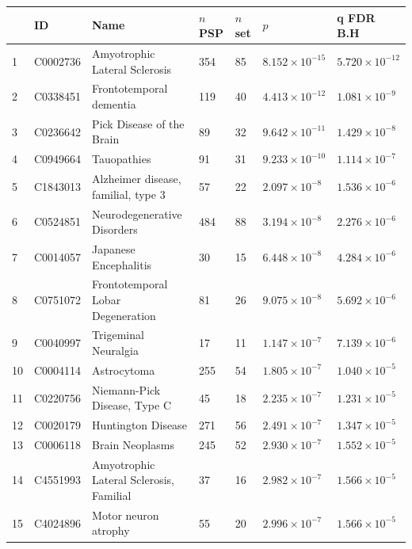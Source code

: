 \begin{table}[ht]
\centering

\setlength{\extrarowheight}{2pt}
\begin{adjustbox}{width=\textwidth}

\begin{tabular}{lllllll}
  \toprule
 & ID & Name & $n$ PSP & $n$ set & $p$ & q FDR B.H \\ 
  \midrule
1 & C0002736 & Amyotrophic Lateral Sclerosis & 354 & 85 & $8.152 \times 10^{-15}$ & $5.720 \times 10^{-12}$ \\ 
  2 & C0338451 & Frontotemporal dementia & 119 & 40 & $4.413 \times 10^{-12}$ & $1.081 \times 10^{-9}$ \\ 
  3 & C0236642 & Pick Disease of the Brain & 89 & 32 & $9.642 \times 10^{-11}$ & $1.429 \times 10^{-8}$ \\ 
  4 & C0949664 & Tauopathies & 91 & 31 & $9.233 \times 10^{-10}$ & $1.114 \times 10^{-7}$ \\ 
  5 & C1843013 & Alzheimer disease, familial, type 3 & 57 & 22 & $2.097 \times 10^{-8}$ & $1.536 \times 10^{-6}$ \\ 
  6 & C0524851 & Neurodegenerative Disorders & 484 & 88 & $3.194 \times 10^{-8}$ & $2.276 \times 10^{-6}$ \\ 
  7 & C0014057 & Japanese Encephalitis & 30 & 15 & $6.448 \times 10^{-8}$ & $4.284 \times 10^{-6}$ \\ 
  8 & C0751072 & Frontotemporal Lobar Degeneration & 81 & 26 & $9.075 \times 10^{-8}$ & $5.692 \times 10^{-6}$ \\ 
  9 & C0040997 & Trigeminal Neuralgia & 17 & 11 & $1.147 \times 10^{-7}$ & $7.139 \times 10^{-6}$ \\ 
  10 & C0004114 & Astrocytoma & 255 & 54 & $1.805 \times 10^{-7}$ & $1.040 \times 10^{-5}$ \\ 
  11 & C0220756 & Niemann-Pick Disease, Type C & 45 & 18 & $2.235 \times 10^{-7}$ & $1.231 \times 10^{-5}$ \\ 
  12 & C0020179 & Huntington Disease & 271 & 56 & $2.491 \times 10^{-7}$ & $1.347 \times 10^{-5}$ \\ 
  13 & C0006118 & Brain Neoplasms & 245 & 52 & $2.930 \times 10^{-7}$ & $1.552 \times 10^{-5}$ \\ 
  14 & C4551993 & Amyotrophic Lateral Sclerosis, Familial & 37 & 16 & $2.982 \times 10^{-7}$ & $1.566 \times 10^{-5}$ \\ 
  15 & C4024896 & Motor neuron atrophy & 55 & 20 & $2.996 \times 10^{-7}$ & $1.566 \times 10^{-5}$ \\ 

\end{tabular}
\end{adjustbox}
\end{table}
